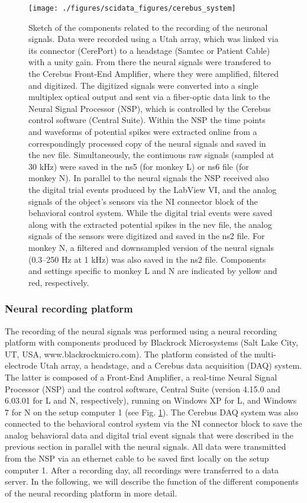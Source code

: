 {\begin{figure}
 \texttt{[image: ./figures/scidata\_figures/cerebus\_system]}
 \caption[Sketch of the components related to the recording of the neuronal signals]{Sketch of the components related to the recording of the neuronal signals. Data were recorded
using a Utah array, which was linked via its connector (CerePort) to a headstage (Samtec or Patient Cable) with a unity gain. From there the neural signals were transfered to the Cerebus Front-End Amplifier, where they were amplified, filtered and digitized. The digitized signals were converted into a single multiplex optical output and sent via a fiber-optic data link to the Neural Signal Processor (NSP), which is controlled by the Cerebus control software (Central Suite). Within the NSP the time points and waveforms of potential spikes were extracted online from a correspondingly processed copy of the neural signals and saved in the nev file. Simultaneously, the continuous raw signals (sampled at 30 kHz) were saved in the ns5 (for monkey L) or ns6 file (for monkey N). In parallel to the neural signals the NSP received also the digital trial events produced by the LabView VI, and the analog signals of the object’s sensors via the NI connector block of the behavioral control system. While the digital trial events were saved along with the extracted potential spikes in the nev file,
the analog signals of the sensors were digitized and saved in the ns2 file. For monkey N, a filtered and downsampled version of the neural signals (0.3–250 Hz at 1 kHz) was also saved in the ns2 file. Components and settings specific to monkey L and N are indicated by yellow and red, respectively.}
\label{fig:cerebus_system}
\end{figure}


\subsubsection{Neural recording platform}
\label{sec:neural_recording_platform}
The recording of the neural signals was performed using a neural recording platform with components produced by Blackrock Microsystems (Salt Lake City, UT, USA, www.blackrockmicro.com). The platform consisted of the multi-electrode Utah array, a headstage, and a Cerebus data acquisition (DAQ) system. The latter is composed of a Front-End Amplifier, a real-time Neural Signal Processor (NSP) and the control software, Central Suite (version 4.15.0 and 6.03.01 for L and N, respectively), running on Windows XP for L, and Windows 7 for N on the setup computer 1 (see Fig. \cref{fig:cerebus_system}). The Cerebus DAQ system was also connected to the behavioral control system via the NI connector block to save the analog behavioral data and digital trial event signals that were described in the previous section in parallel with the neural signals. All data were transmitted from the NSP via an ethernet cable to be saved first locally on the setup computer 1. After a recording day, all recordings were transferred to a data server. In the following, we will describe the function of the different components of the neural recording platform in more detail.

}

